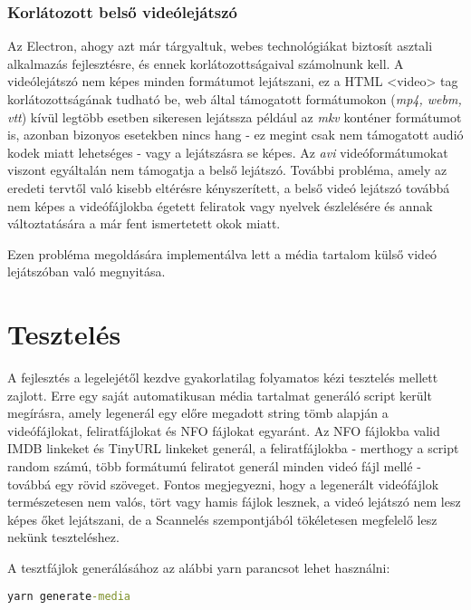 \subsubsection{Korlátozott belső videólejátszó}
Az Electron, ahogy azt már tárgyaltuk, webes technológiákat biztosít asztali alkalmazás fejlesztésre, és ennek korlátozottságaival számolnunk kell. A videólejátszó nem képes minden formátumot lejátszani, ez a HTML <video> tag korlátozottságának tudható be, web által támogatott formátumokon ({\it mp4, webm, vtt}) kívül legtöbb esetben sikeresen lejátssza például az {\it mkv} konténer formátumot is, azonban bizonyos esetekben nincs hang - ez megint csak nem támogatott audió kodek miatt lehetséges - vagy a lejátszásra se képes. Az {\it avi} videóformátumokat viszont egyáltalán nem támogatja a belső lejátszó.
További probléma, amely az eredeti tervtől való kisebb eltérésre kényszerített, a belső videó lejátszó továbbá nem képes a videófájlokba égetett feliratok vagy nyelvek észlelésére és annak változtatására a már fent ismertetett okok miatt.

Ezen probléma megoldására implementálva lett a média tartalom külső videó lejátszóban való megnyitása.

\section{Tesztelés}
A fejlesztés a legelejétől kezdve gyakorlatilag folyamatos kézi tesztelés mellett zajlott. Erre egy saját automatikusan média tartalmat generáló script került megírásra, amely legenerál egy előre megadott string tömb alapján a videófájlokat, feliratfájlokat és NFO fájlokat egyaránt. Az NFO fájlokba valid IMDB linkeket és TinyURL linkeket generál, a feliratfájlokba - merthogy a script random számú, több formátumú feliratot generál minden videó fájl mellé - továbbá egy rövid szöveget. Fontos megjegyezni, hogy a legenerált videófájlok természetesen nem valós, tört vagy hamis fájlok lesznek, a videó lejátszó nem lesz képes őket lejátszani, de a Scannelés szempontjából tökéletesen megfelelő lesz nekünk teszteléshez.

A tesztfájlok generálásához az alábbi yarn parancsot lehet használni:
\begin{lstlisting}[language={cmd}, numbers={none}]
    yarn generate-media
\end{lstlisting}

